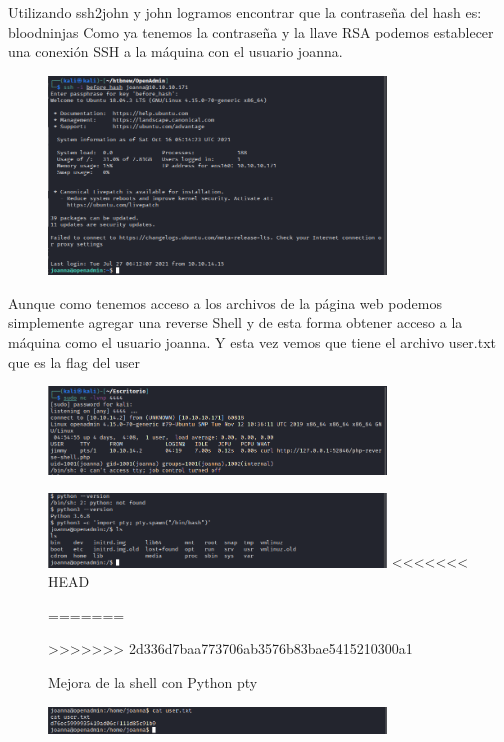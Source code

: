 \documentclass{article}
\begin{document}
Utilizando ssh2john y john logramos encontrar que la contraseña del hash es: bloodninjas
Como ya tenemos la contraseña y la llave RSA podemos establecer una conexión SSH a la máquina con el usuario joanna.
\begin{figure}[H]
	\center
	\includegraphics[width=0.8\textwidth]{images/openadmin/16-sshjoanna.png}
	\caption{}
\end{figure}

Aunque como tenemos acceso a los archivos de la página web podemos simplemente agregar una reverse Shell y de esta forma obtener acceso a la máquina como el usuario joanna. Y esta vez vemos que tiene el archivo user.txt que es la flag del user
\begin{figure}[H]
	\center
	\includegraphics[width=0.8\textwidth]{images/openadmin/17-alternativa.png}
	\caption{}
\end{figure}

\begin{figure}[H]
	\center
	\includegraphics[width=0.8\textwidth]{images/openadmin/17-alternativa2.png}
<<<<<<< HEAD
	\caption{}
=======
	\caption{Mejora de la shell con Python pty}
>>>>>>> 2d336d7baa773706ab3576b83bae5415210300a1
\end{figure}

\begin{figure}[H]
	\center
	\includegraphics[width=0.8\textwidth]{images/openadmin/17-alternativa3.png}
	\caption{}
\end{figure}
\end{document}
